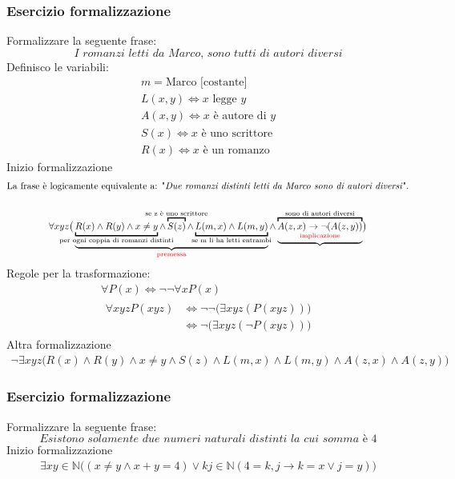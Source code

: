 \documentclass[italian]{article}
\newcommand{\N}{\text{$\mathbb{N}$}}
\begin{document}
\subsubsection{Esercizio formalizzazione}
Formalizzare la seguente frase:
\[
	\textit{I romanzi letti da Marco, sono tutti di autori diversi}
\]
Definisco le variabili:
\begin{gather*}
	m = \text{Marco [costante]} \\
	L(x,y) \Leftrightarrow \text{$x$ legge $y$} \\
	A(x,y) \Leftrightarrow \text{$x$ è autore di $y$} \\
	S(x) \Leftrightarrow \text{$x$ è uno scrittore} \\
	R(x) \Leftrightarrow \text{$x$ è un romanzo}
\end{gather*}
Inizio formalizzazione
\begin{gather*}
	\text{La frase è logicamente equivalente a: "\textit{Due romanzi distinti letti da Marco sono di autori diversi}".}\\\\
	\forall xyz \bigr( \underbrace{\underbracket{R(x) \land R(y) \land x\neq y}_{\mathclap{\text{per ogni coppia di romanzi distinti}}} \land \overbracket{S(z)}^{\mathclap{\text{se z è uno scrittore}}} \land \underbracket{L(m,x) \land L(m,y)}_{\mathclap{\text{se m li ha letti entrambi}}}}_{\text{\textcolor{red}{premessa}}} \land \underbrace{\overbracket{A(z,x) \to \lnot(A(z,y))}^{\mathclap{\text{sono di autori diversi}}}_{\text{\textcolor{red}{implicazione}}}}\bigr)
\end{gather*}
Regole per la trasformazione:
\begin{gather*}
	\forall P(x) \Leftrightarrow \lnot\lnot\forall x P(x)\\
	\begin{split}
		\forall xyz P(xyz) &\Leftrightarrow \lnot\lnot\big( \exists xyz ( P(xyz))\big)\\
		& \Leftrightarrow \lnot\big( \exists xyz ( \lnot P(xyz))\big)
	\end{split}
\end{gather*}
Altra formalizzazione
\begin{gather*}
	\lnot\exists xyz \bigr( R(x) \land R(y) \land x\neq y \land S(z) \land L(m,x) \land L(m,y) \land A(z,x) \land A(z,y)\bigr)
\end{gather*}
\pagebreak
\subsubsection{Esercizio formalizzazione}
Formalizzare la seguente frase:
\[
	\textit{Esistono solamente due numeri naturali distinti la cui somma è }4
\]
Inizio formalizzazione
\begin{gather*}
	\exists xy \in \N \bigr((x\neq y \land x+y=4) \lor kj \in \N (4=k,j \to k=x \lor j=y)\bigr)
\end{gather*}
\end{document}
